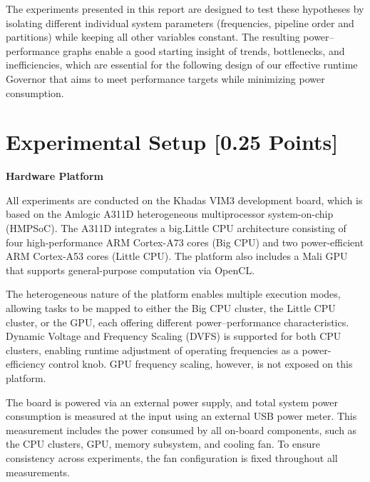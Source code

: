 \documentclass{uva-inf-article}
\begin{document}
The experiments presented in this report are designed to test these hypotheses by isolating different individual system parameters (frequencies, pipeline order and partitions) while keeping all other variables constant. The resulting power--performance graphs enable a good starting insight of trends, bottlenecks, and inefficiencies, which are essential for the following design of our effective runtime Governor that aims to meet performance targets while minimizing power consumption.



\section{Experimental Setup [0.25 Points]} 


\textbf{Hardware Platform}

All experiments are conducted on the Khadas VIM3 development board, which is based on the Amlogic A311D heterogeneous multiprocessor system-on-chip (HMPSoC). The A311D integrates a big.Little CPU architecture consisting of four high-performance ARM Cortex-A73 cores (Big CPU) and two power-efficient ARM Cortex-A53 cores (Little CPU). The platform also includes a Mali GPU that supports general-purpose computation via OpenCL.

The heterogeneous nature of the platform enables multiple execution modes, allowing tasks to be mapped to either the Big CPU cluster, the Little CPU cluster, or the GPU, each offering different power--performance characteristics. Dynamic Voltage and Frequency Scaling (DVFS) is supported for both CPU clusters, enabling runtime adjustment of operating frequencies as a power-efficiency control knob. GPU frequency scaling, however, is not exposed on this platform.

The board is powered via an external power supply, and total system power consumption is measured at the input using an external USB power meter. This measurement includes the power consumed by all on-board components, such as the CPU clusters, GPU, memory subsystem, and cooling fan. To ensure consistency across experiments, the fan configuration is fixed throughout all measurements.
\end{document}
